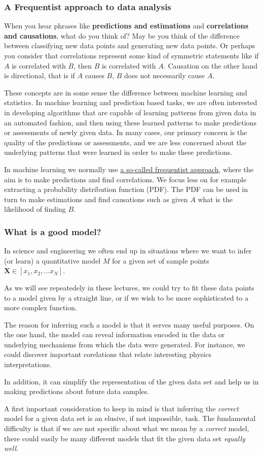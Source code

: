 \documentclass{beamer}
\begin{document}
\begin{frame}
\frametitle{A Frequentist approach to data analysis}

When you hear phrases like \textbf{predictions and estimations} and
\textbf{correlations and causations}, what do you think of?  May be you think
of the difference between classifying new data points and generating
new data points.
Or perhaps you consider that correlations represent some kind of symmetric statements like
if $A$ is correlated with $B$, then $B$ is correlated with
$A$. Causation on the other hand is directional, that is if $A$ causes $B$, $B$ does not
necessarily cause $A$.

These concepts are in some sense the difference between machine
learning and statistics. In machine learning and prediction based
tasks, we are often interested in developing algorithms that are
capable of learning patterns from given data in an automated fashion,
and then using these learned patterns to make predictions or
assessments of newly given data. In many cases, our primary concern
is the quality of the predictions or assessments, and we are less
concerned about the underlying patterns that were learned in order
to make these predictions.

In machine learning we normally use \href{{https://en.wikipedia.org/wiki/Frequentist_inference}}{a so-called frequentist approach},
where the aim is to make predictions and find correlations. We focus
less on for example extracting a probability distribution function (PDF). The PDF can be
used in turn to make estimations and find causations such as given $A$
what is the likelihood of finding $B$.
\end{frame}

\begin{frame}
\frametitle{What is a good model?}

In science and engineering we often end up in situations where we want to infer (or learn) a
quantitative model $M$ for a given set of sample points $\bm{X} \in [x_1, x_2,\dots x_N]$.

As we will see repeatedely in these lectures, we could try to fit these data points to a model given by a
straight line, or if we wish to be more sophisticated to a more complex
function.

The reason for inferring such a model is that it
serves many useful purposes. On the one hand, the model can reveal information
encoded in the data or underlying mechanisms from which the data were generated. For instance, we could discover important
corelations that relate interesting physics interpretations.

In addition, it can simplify the representation of the given data set and help
us in making predictions about  future data samples.

A first important consideration to keep in mind is that inferring the \emph{correct} model
for a given data set is an elusive, if not impossible, task. The fundamental difficulty
is that if we are not specific about what we mean by a \emph{correct} model, there
could easily be many different models that fit the given data set \emph{equally well}.
\end{frame}
\end{document}

